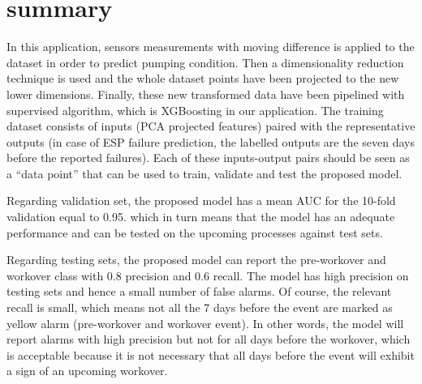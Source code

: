 \section{summary}
In this application, sensors measurements with moving difference is applied to the dataset in order to predict pumping condition. Then a dimensionality reduction technique is used and the whole dataset points have been projected to the new lower dimensions. Finally, these new transformed data have been pipelined with supervised algorithm, which is XGBoosting in our application. The training dataset consists of inputs (PCA projected features) paired with the representative outputs (in case of ESP failure prediction, the labelled outputs are the seven days before the reported failures). Each of these inputs-output pairs should be seen as a “data point” that can be used to train, validate and test the proposed model. 

Regarding validation set, the proposed model has a mean AUC for the 10-fold validation equal to 0.95. which in turn means that the model has an adequate performance and can be tested on the upcoming processes against test sets. 

Regarding testing sets, the proposed model can report the pre-workover and workover class with 0.8 precision and 0.6 recall. The model has high precision on testing sets and hence a small number of false alarms. Of course, the relevant recall is small, which means not all the 7 days before the event are marked as yellow alarm (pre-workover and workover event). In other words, the model will report alarms with high precision but not for all days before the workover, which is acceptable because it is not necessary that all days before the event will exhibit a sign of an upcoming workover.     
